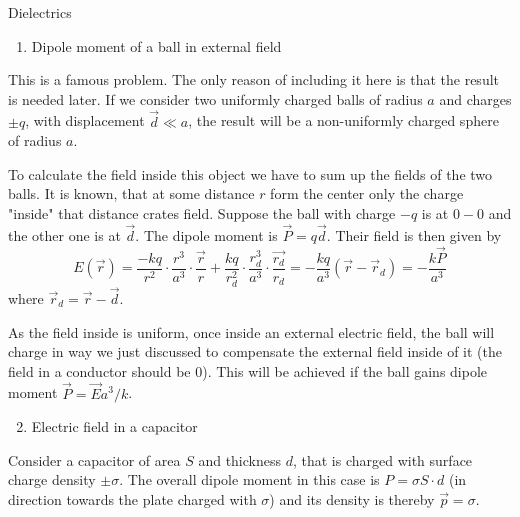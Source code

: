 \begin{enumerate}

{\bfseries
\item Dielectrics
}

\begin{enumerate}
    \item Dipole moment of a ball in external field
\end{enumerate}

\hspace{.5cm}
This is a famous problem.
The only reason of including it here is that the result is needed later.
If we consider two uniformly charged balls of radius $a$ and charges $\pm q$,
with displacement $\vec{d} \ll a$,
the result will be a non-uniformly charged sphere of radius $a$.

\hspace{.5cm}
To calculate the field inside this object
we have to sum up the fields of the two balls.
It is known, that at some distance $r$ form the center
only the charge "inside" that distance crates field.
Suppose the ball with charge $-q$ is at $0-0$
and the other one is at $\vec{d}$.
The dipole moment is $\vec{P} = q \vec{d}$.
Their field is then given by
\begin{equation}
    E(\vec{r}) = \frac{-k q}{r^2} \cdot \frac{r^3}{a^3} \cdot \frac{\vec{r}}{r} +
        \frac{k q}{r_d^2} \cdot \frac{r_d^3}{a^3} \cdot \frac{\vec{r_d}}{r_d} =
        -\frac{kq}{a^3}(\vec{r} - \vec{r}_d) = -\frac{k \vec{P}}{a^3}
\end{equation}
where $\vec{r}_d = \vec{r} - \vec{d}$.

\hspace{.5cm}
As the field inside is uniform,
once inside an external electric field,
the ball will charge in way we just discussed
to compensate the external field inside of it
(the field in a conductor should be $0$).
This will be achieved if the ball gains dipole moment
$\vec{P} = \vec{E} a^3 / k$.

\begin{enumerate}
    \setcounter{enumii}{1}
    \item Electric field in a capacitor
\end{enumerate}

\hspace{.5cm}
Consider a capacitor of area $S$ and thickness $d$,
that is charged with surface charge density $\pm \sigma$.
The overall dipole moment in this case is $P = \sigma S \cdot d$
(in direction towards the plate charged with $\sigma$)
and its density is thereby $\vec{p} = \sigma$.


\end{enumerate}
